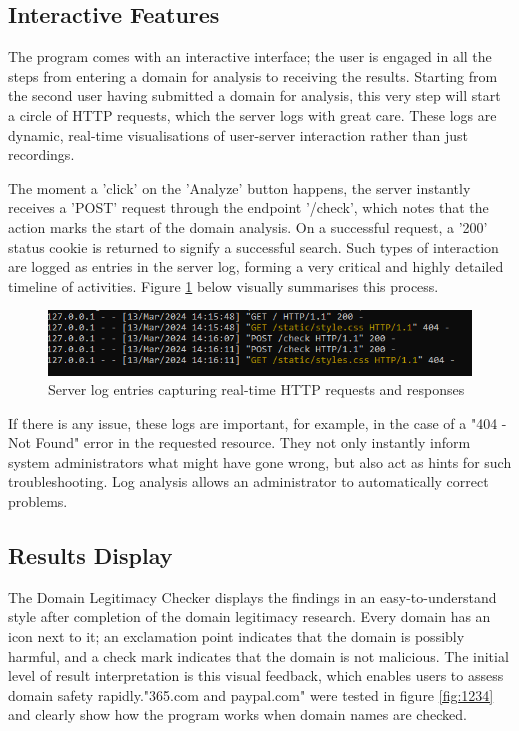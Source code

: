 \subsection{Interactive Features}

The program comes with an interactive interface; the user is engaged in all the steps from entering a domain for analysis to receiving the results. Starting from the second user having submitted a domain for analysis, this very step will start a circle of HTTP requests, which the server logs with great care. These logs are dynamic, real-time visualisations of user-server interaction rather than just recordings.


The moment a 'click' on the 'Analyze' button happens, the server instantly receives a 'POST' request through the endpoint '/check', which notes that the action marks the start of the domain analysis. On a successful request, a '200' status cookie is returned to signify a successful search. Such types of interaction are logged as entries in the server log, forming a very critical and highly detailed timeline of activities. Figure \ref{fig:imple22222} below visually summarises this process.

\begin{figure}[H]
    \centering
    \includegraphics[width=0.8\linewidth]{project/I.png}
    \caption{Server log entries capturing real-time HTTP requests and responses}
    \label{fig:imple22222}
\end{figure}

If there is any issue, these logs are important, for example, in the case of a "404 - Not Found" error in the requested resource. They not only instantly inform system administrators what might have gone wrong, but also act as hints for such troubleshooting. Log analysis allows an administrator to automatically correct problems.

\subsection{Results Display}

The Domain Legitimacy Checker displays the findings in an easy-to-understand style after completion of the domain legitimacy research. Every domain has an icon next to it; an exclamation point indicates that the domain is possibly harmful, and a check mark indicates that the domain is not malicious. The initial level of result interpretation is this visual feedback, which enables users to assess domain safety rapidly."365.com and paypal.com" were tested in figure \ref{fig:1234} and clearly show how the program works when domain names are checked.

